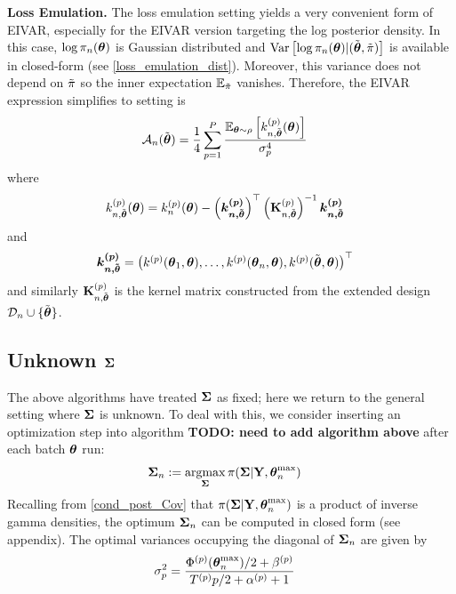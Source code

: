 \documentclass[12pt]{article}
\begin{document}
\bigskip
\noindent
\textbf{Loss Emulation.} The loss emulation setting yields a very convenient form of EIVAR, especially for the EIVAR version targeting the log posterior density. In this case,
$\log \pi_{n}(\boldsymbol{\theta})$ is Gaussian distributed and $\mathrm{Var}\left[\log \pi_{n}(\boldsymbol{\theta}) | (\tilde{\boldsymbol{\theta}}, \tilde{\pi}) \right]$ is 
available in closed-form (see \ref{loss_emulation_dist}). Moreover, this variance does not depend on $\tilde{\pi}$ so the inner expectation $\mathbb{E}_{\tilde{\pi}}$ vanishes. 
Therefore, the EIVAR expression simplifies to  
setting is 
\begin{align}
\mathcal{A}_{n}(\tilde{\boldsymbol{\theta}}) &= \frac{1}{4} \sum_{p = 1}^{P} \frac{\mathbb{E}_{\boldsymbol{\theta} \sim \rho}\left[k_{n, \tilde{\boldsymbol{\theta}}}^{(p)}(\boldsymbol{\theta})\right]}{\sigma_{p}^4} \label{EIVAR_llik_loss_emulation}
\end{align}
where 
\begin{align*}
k_{n, \tilde{\boldsymbol{\theta}}}^{(p)}(\boldsymbol{\theta}) &= k_{n}^{(p)}(\boldsymbol{\theta}) - \left(\boldsymbol{k^{(p)}_{n,\tilde{\boldsymbol{\theta}}}}\right)^\top \left(\mathbf{K}_{n, \tilde{\boldsymbol{\theta}}}^{(p)}\right)^{-1} \boldsymbol{k^{(p)}_{n, \tilde{\boldsymbol{\theta}}}}
\end{align*}
and 
\begin{align*}
\boldsymbol{k^{(p)}_{n, \tilde{\boldsymbol{\theta}}}} &= \begin{pmatrix} k^{(p)}(\boldsymbol{\theta}_1, \boldsymbol{\theta}), \dots, 
														       k^{(p)}(\boldsymbol{\theta}_{n}, \boldsymbol{\theta}), 
														       k^{(p)}(\tilde{\boldsymbol{\theta}}, \boldsymbol{\theta})  \end{pmatrix}^\top 
\end{align*}
and similarly $\mathbf{K}_{n, \tilde{\boldsymbol{\theta}}}^{(p)}$ is the kernel matrix constructed from the extended design $\mathcal{D}_{n} \cup \{\tilde{\boldsymbol{\theta}}\}$.

\subsection{Unknown $\boldsymbol{\Sigma}$}
The above algorithms have treated $\boldsymbol{\Sigma}$ as fixed; here we return to the general setting where $\boldsymbol{\Sigma}$ is unknown. To deal with this, we consider inserting an 
optimization step into algorithm \textbf{TODO: need to add algorithm above} after each batch $\boldsymbol{\theta}$ run:
\begin{align}
\boldsymbol{\Sigma}_{n} &:= \operatorname*{argmax}_{\boldsymbol{\Sigma}} \pi(\boldsymbol{\Sigma}|\mathbf{Y}, \boldsymbol{\theta}_{n}^{\text{max}}) \label{Cov_optimization}
\end{align}
Recalling from \ref{cond_post_Cov} that $\pi(\boldsymbol{\Sigma}|\mathbf{Y}, \boldsymbol{\theta}_{n}^{\text{max}})$ is a product of inverse gamma densities, the optimum $\boldsymbol{\Sigma}_{n}$ can 
be computed in closed form (see appendix). The optimal variances occupying the diagonal of $\boldsymbol{\Sigma}_{n}$ are given by 
\begin{align}
\sigma_{p}^2 &= \frac{{\Phi}^{(p)}(\boldsymbol{\theta}_{n}^{\text{max}})/2 + {\beta}^{(p)}}{{T}^{(p)}{p}/2 + {\alpha}^{(p)} + 1}
\end{align}
\end{document}

